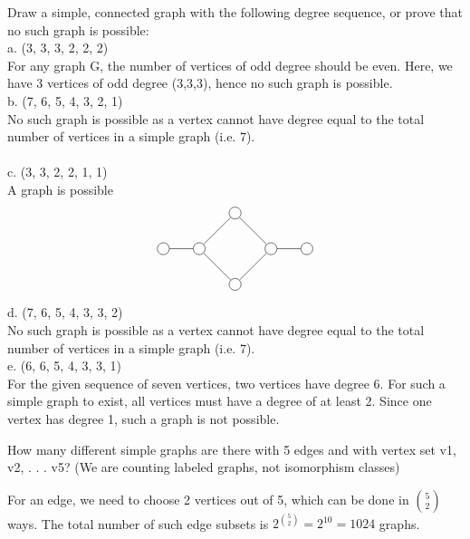 \documentclass[12pt]{article}
\newenvironment{question}[2][Question]{\begin{trivlist}
\item[\hskip \labelsep {\bfseries #1}\hskip \labelsep {\bfseries #2.}]}{\end{trivlist}}
\begin{document}
\begin{question}{6}
Draw a simple, connected graph with the following degree sequence, or prove that no such graph
is possible: \\
a. (3, 3, 3, 2, 2, 2) \\
For any graph G, the number of vertices of odd degree should be even. Here, we have 3 vertices of odd degree (3,3,3), hence no such graph is possible. \\
b. (7, 6, 5, 4, 3, 2, 1) \\
No such graph is possible as a vertex cannot have degree equal to the total number of vertices in a simple graph (i.e. 7). \\ \\
c. (3, 3, 2, 2, 1, 1) \\
A graph is possible \\
\begin{align*}
\begin{tikzpicture}
\node[shape=circle,draw=black] (A) at (-1,0) {};
\node[shape=circle,draw=black] (B) at (0,1) {};
\node[shape=circle,draw=black] (C) at (1,0) {};
\node[shape=circle,draw=black] (D) at (0,-1) {};
\node[shape=circle,draw=black] (E) at (-2,0) {};
\node[shape=circle,draw=black] (F) at (2,0) {};
\path [] (A) edge node[left] {} (B);
\path [] (B) edge node[left] {} (C);
\path [] (C) edge node[left] {} (D);
\path [] (D) edge node[left] {} (A);
\path [] (A) edge node[left] {} (E);
\path [] (C) edge node[left] {} (F);
\end{tikzpicture}
\end{align*}
d. (7, 6, 5, 4, 3, 3, 2) \\
No such graph is possible as a vertex cannot have degree equal to the total number of vertices in a simple graph (i.e. 7). \\
e. (6, 6, 5, 4, 3, 3, 1)\\
For the given sequence of seven vertices, two vertices have degree 6. For such a simple graph to exist, all vertices must have a degree of at least 2. Since one vertex has degree 1, such a graph is not possible.
\end{question}

\begin{question}{7}
 How many different simple graphs are there with 5 edges and with vertex set {v1, v2, . . . v5}?
(We are counting labeled graphs, not isomorphism classes)
\end{question}

For an edge, we need to choose 2 vertices out of 5, which can be done in ${5 \choose 2}$ ways. The total number of such edge subsets is $2^{5 \choose 2} = 2^{10} = 1024$ graphs.
\end{document}
